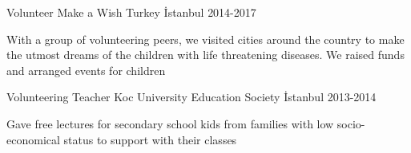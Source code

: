 

\begin{cventries}

  \cventry
    {Volunteer} %
    {Make a Wish Turkey} %
    {İstanbul} %
    {2014-2017} %
    {
      \begin{cvitems} %
        \item {With a group of volunteering peers, we visited cities around the country to make the utmost dreams of the children with life threatening diseases. We raised funds and arranged events for children}
      \end{cvitems}
    }

  \cventry
    {Volunteering Teacher} %
    {Koc University Education Society} %
    {İstanbul} %
    {2013-2014} %
    {
      \begin{cvitems} %
        \item {Gave free lectures for secondary school kids from families with low socio-economical status to support with their classes}
      \end{cvitems}
    }

\end{cventries}
